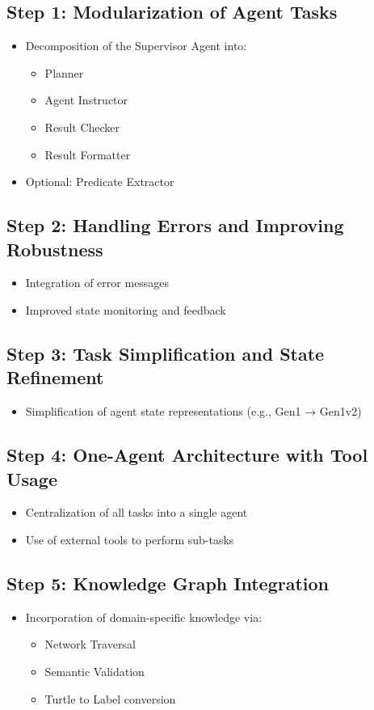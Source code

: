 \documentclass[a4paper,oneside,bibliography=totoc]{scrbook}
\begin{document}
\subsection{Step 1: Modularization of Agent Tasks}
\begin{itemize}
  \item Decomposition of the Supervisor Agent into:
        \begin{itemize}
          \item Planner
          \item Agent Instructor
          \item Result Checker
          \item Result Formatter
        \end{itemize}
  \item Optional: Predicate Extractor
\end{itemize}

\subsection{Step 2: Handling Errors and Improving Robustness}
\begin{itemize}
  \item Integration of error messages
  \item Improved state monitoring and feedback
\end{itemize}

\subsection{Step 3: Task Simplification and State Refinement}
\begin{itemize}
  \item Simplification of agent state representations (e.g., Gen1 → Gen1v2)
\end{itemize}

\subsection{Step 4: One-Agent Architecture with Tool Usage}
\begin{itemize}
  \item Centralization of all tasks into a single agent
  \item Use of external tools to perform sub-tasks
\end{itemize}

\subsection{Step 5: Knowledge Graph Integration}
\begin{itemize}
  \item Incorporation of domain-specific knowledge via:
        \begin{itemize}
          \item Network Traversal
          \item Semantic Validation
          \item Turtle to Label conversion
        \end{itemize}
\end{itemize}
\end{document}
